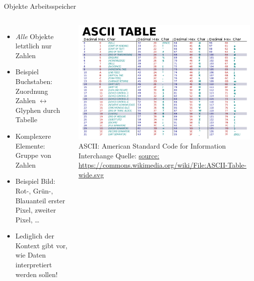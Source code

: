 \begin{frame}[fragile]{Objekte Arbeitsspeicher}
%
\begin{columns}
	\begin{itemize}
	\item \emph{Alle} Objekte letztlich nur Zahlen
	\item Beispiel Buchstaben: Zuordnung \newline 
		Zahlen $\leftrightarrow$ Glyphen durch Tabelle
	\item Komplexere Elemente: Gruppe von Zahlen
	\item Beispiel Bild: Rot-, Grün-, Blauanteil erster Pixel, zweiter Pixel, \ldots
	\item Lediglich der Kontext gibt vor, wie Daten interpretiert werden sollen!
	\end{itemize}
	\includegraphics[width=\linewidth]{./gfx/ASCII_table}\newline
	\tiny ASCII: American Standard Code for Information Interchange\newline
	Quelle: \url{source: https://commons.wikimedia.org/wiki/File:ASCII-Table-wide.svg}
\end{columns}
%
\end{frame}


